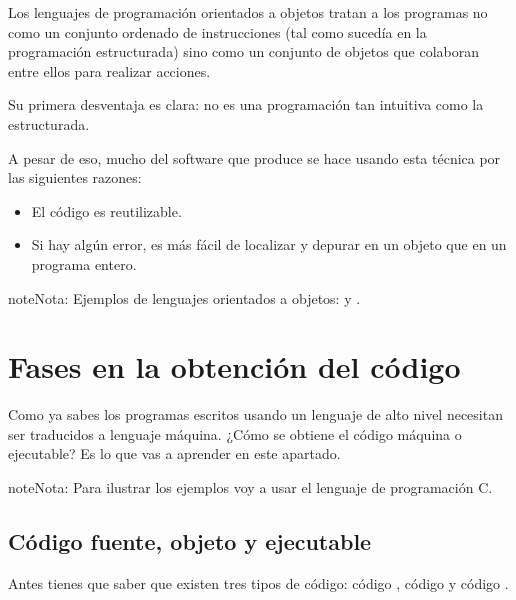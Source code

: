 \documentclass[letterpaper,10pt,spanish]{sphinxmanual}
\begin{document}
\sphinxAtStartPar
Los lenguajes de programación orientados a objetos tratan a los programas no como un conjunto ordenado de instrucciones (tal como sucedía en la programación estructurada) sino como un conjunto de objetos que colaboran entre ellos para realizar acciones.

\sphinxAtStartPar
Su primera desventaja es clara: no es una programación tan intuitiva como la estructurada.

\sphinxAtStartPar
A pesar de eso, mucho del software que produce se hace usando esta técnica por las siguientes razones:
\begin{itemize}
\item {} 
\sphinxAtStartPar
El código es reutilizable.

\item {} 
\sphinxAtStartPar
Si hay algún error, es más fácil de localizar y depurar en un objeto que en un programa entero.

\end{itemize}

\begin{sphinxadmonition}{note}{Nota:}
\sphinxAtStartPar
Ejemplos de lenguajes orientados a objetos:  y .
\end{sphinxadmonition}

\sphinxstepscope


\chapter{Fases en la obtención del código}
\label{\detokenize{obtencion_del_codigo:fases-en-la-obtencion-del-codigo}}\label{\detokenize{obtencion_del_codigo::doc}}
\sphinxAtStartPar
Como ya sabes los programas escritos usando un lenguaje de alto nivel necesitan ser traducidos a lenguaje máquina. ¿Cómo se obtiene el código máquina o ejecutable? Es lo que vas a aprender en este apartado.

\begin{sphinxadmonition}{note}{Nota:}
\sphinxAtStartPar
Para ilustrar los ejemplos voy a usar el lenguaje de programación C.
\end{sphinxadmonition}


\section{Código fuente, objeto y ejecutable}
\label{\detokenize{obtencion_del_codigo:codigo-fuente-objeto-y-ejecutable}}
\sphinxAtStartPar
Antes tienes que saber que existen tres tipos de código: código , código  y código .
\end{document}
